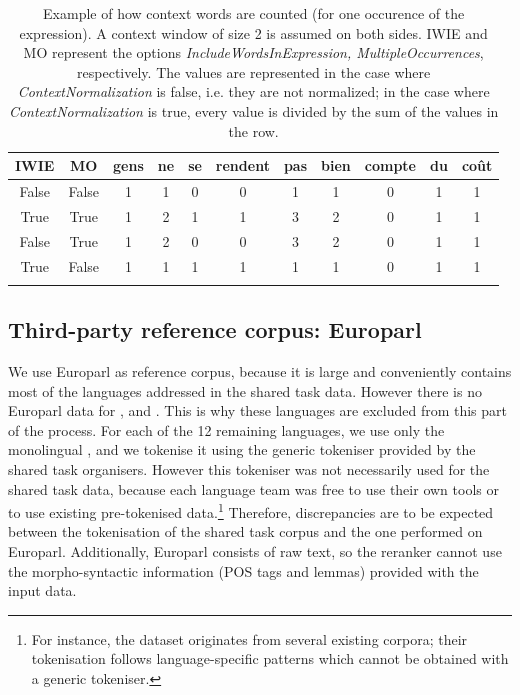 \documentclass[output=paper,modfonts,nonflat]{langsci/langscibook}
\begin{document}
 \begin{table}
{\small
\begin{tabular}{ccccccccccc}
\lsptoprule
 IWIE & MO & gens & ne & {\bf se} & {\bf rendent} & pas & bien & {\bf compte} & du & coût \\
\midrule
  
  False   &      False                       & 1 & 1 & 0 & 0& 1& 1& 0& 1& 1 \\

  True&           True                       &1&2&1&1&3&2&0&1&1\\

  False    &      True                       &1&2&0&0&3&2&0&1&1 \\


  True &          False                       &1&1&1&1&1&1&0&1&1\\
\lspbottomrule

\end{tabular}
}
\caption{\label{tab:contextExample}{Example of how context words are counted (for one occurence of the expression).} A context window of size 2 is assumed on both sides. IWIE and MO represent the options {\em IncludeWordsInExpression, MultipleOccurrences}, respectively. The values are represented in the case where {\em ContextNormalization} is false, i.e. they are not normalized; in the case where {\em ContextNormalization} is true, every value is divided by the sum of the values in the row.}
\end{table}



\subsection{Third-party reference corpus: Europarl}
\label{subsec:europarl}

We use Europarl \citep{europarl} as reference corpus, because it is
large and conveniently contains most of the languages addressed in the
shared task data. However there is no Europarl data for , 
and . This is why these languages are excluded from this part
of the process. For each of the 12 remaining languages, we use only
the monolingual , and we tokenise it using the generic
tokeniser provided by the shared task organisers. However this
tokeniser was not necessarily used for the shared task data, because
each language team was free to use their own tools or to use existing
pre-tokenised data.\footnote{For instance, the  dataset
  originates from several existing corpora; their tokenisation follows
  language-specific patterns which cannot be obtained with a generic
  tokeniser.}  Therefore, discrepancies are to be expected between the
tokenisation of the shared task corpus and the one performed on
Europarl. Additionally, Europarl consists of raw text, so the reranker
cannot use the morpho-syntactic information (POS tags and lemmas)
provided with the input data.
\end{document}
